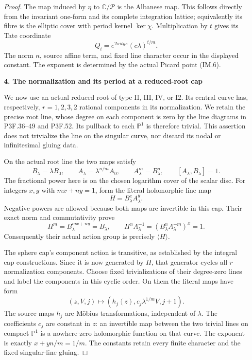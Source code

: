 \begin{proof}
The map induced by \(\eta\) to \(\mathbb C/\mathcal P\)
is the Albanese map. This follows directly from the invariant
one-form and its complete integration lattice; equivalently its
fibre is the elliptic cover with period kernel \(\ker\chi\).
Multiplication by \(t\) gives its Tate coordinate
\[
           Q_i=e^{2\pi i t y\kappa}(c\lambda)^{t/m}.
                                                               \tag{IM.14}
\]
The norm \(n\), source affine term, and fixed line character occur
in the displayed constant. The exponent is determined by the actual
Picard point (IM.6).

\par

\medskip\noindent\textbf{4. The normalization and its period at a reduced-root cap}

\par\nobreak

We now use an actual reduced root of type II, III, IV, or I2. Its
central curve has, respectively, \(r=1,2,3,2\) rational components
in its normalization. We retain the precise root line, whose degree
on each component is zero by the line diagrams in P3F.36--49 and
P3F.52. Its pullback to each \(\mathbb P^1\) is therefore
trivial. This assertion does not trivialize the line on the singular
curve, nor discard its nodal or infinitesimal gluing data.

On the actual root line the two maps satisfy
\[
 B_\lambda=\lambda B_0,\qquad
 A_\lambda=\lambda^{n/m}A_0,\qquad
 A_\lambda^m=B_\lambda^n,
 \qquad[A_\lambda,B_\lambda]=1.                       \tag{IM.15}
\]
The fractional power here is on the chosen logarithm cover of the
scalar disc. For integers \(x,y\) with \(mx+ny=1\), form the
literal holomorphic line map
\[
                         H=B_\lambda^xA_\lambda^y.
                                                               \tag{IM.16}
\]
Negative powers are allowed because both maps are invertible in
this cap. Their exact norm and commutativity prove
\[
 H^m=B_\lambda^{mx+ny}=B_\lambda,\qquad
 H^n A_\lambda^{-1}
        =(B_\lambda^nA_\lambda^{-m})^x=1.
                                                               \tag{IM.17}
\]
Consequently their actual action group is precisely \(\langle H\rangle\).

The sphere cap's component action is transitive, as established by
the integral cap constructions. Since it is now generated by \(H\),
that generator cycles all \(r\) normalization components. Choose
fixed trivializations of their degree-zero lines and label the
components in this cyclic order. On them the literal maps have form
\[
 (z,V,j)\longmapsto
        (h_j(z),c_j\lambda^{1/m}V,j+1).               \tag{IM.18}
\]
The source maps \(h_j\) are Möbius transformations, independent
of \(\lambda\). The coefficients \(c_j\) are constant in
\(z\): an invertible map between the two trivial lines on compact
\(\mathbb P^1\) is a nowhere-zero holomorphic function on that
curve. The exponent is exactly
\(x+yn/m=1/m\). The constants retain every finite character and
the fixed singular-line gluing.


\end{proof}
